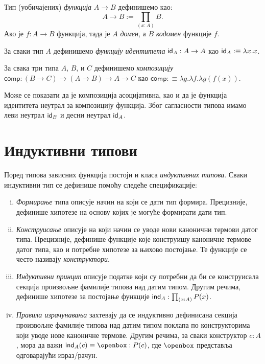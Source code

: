 \documentclass[12pt,oneside]{memoir}
\begin{document}
\begin{definition}
    Тип (уобичајених) \emph{функција} $A \to B$ дефинишемо као:
    \[A \to B:= \prod_{(x:A)} B.\]
    Ако је $f : A \to B$ функција, тада је $A$ \emph{домен}, а $B$ \emph{кодомен} функције $f$. 
\end{definition}

\begin{definition}
    За сваки тип $A$ дефинишемо \emph{функцију идентитета} $\mathsf{id}_{A} : A \to A$ као $\mathsf{id}_{A} :\equiv \lambda x.x$.
\end{definition}

\begin{definition}
    За свака три типа $A$, $B$, и $C$ дефинишемо \emph{композицију} $\mathsf{comp} : (B \to C) \to (A \to B) \to A \to C$ као $\mathsf{comp} :\equiv \lambda g.\lambda f.\lambda  g(f(x))$.
\end{definition}
Може се показати да је композиција асоцијативна, као и да је функција идентитета неутрал за композицију функција. Због сагласности типова имамо леви неутрал $\mathsf{id}_{B}$ и десни неутрал $\mathsf{id}_{A}$.

\section{Индуктивни типови}

Поред типова зависних функција постоји и класа \emph{индуктивних типова}. Сваки индуктивни тип се дефинише помоћу следеће спецификације: 

\begin{enumerate}[(i)]
    \item{\emph{Формирање} типа описује начин на који се дати тип формира. Прецизније, дефинише хипотезе на основу којих је могуће формирати дати тип.}
    \item{\emph{Конструисање} описује на који начин се уводе нови канонични термови датог типа. Прецизније, дефинише функције које конструишу каноничне термове датог типа, као и потребне хипотезе за њихово постојање. Те функције се често називају \emph{конструктори}.}
    \item{\emph{Индуктивни принцип} описује податке који су потребни да би се конструисала секција произвољне фамилије типова над датим типом. Другим речима, дефинише хипотезе за постојање функције $\mathsf{ind}_{A} : \prod_{(x : A)} P(x)$.}
    \item{\emph{Правила израчунавања} захтевају да се индуктивно дефинисана секција произвољне фамилије типова над датим типом поклапа по конструкторима који уводе нове каноничне термове. Другим речима, за сваки конструктор $c : A$, мора да важи $\ind{A}(c) \equiv \openbox : P(c)$, где $\openbox$ представља одговарајући израз/рачун.}
\end{enumerate}
\end{document}
